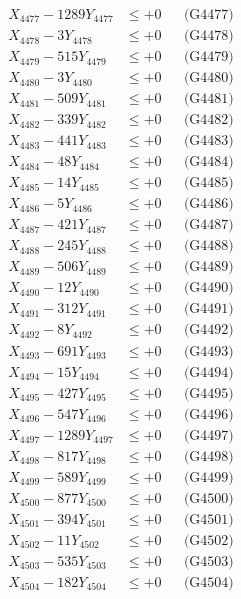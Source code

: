 \documentclass[a4paper,10pt]{article}
\begin{document}
{\begin{align}
X_{4477} - 1289Y_{4477} &\leq +0 && \text{(G4477)} \\
X_{4478} - 3Y_{4478} &\leq +0 && \text{(G4478)} \\
X_{4479} - 515Y_{4479} &\leq +0 && \text{(G4479)} \\
X_{4480} - 3Y_{4480} &\leq +0 && \text{(G4480)} \\
\allowbreak
X_{4481} - 509Y_{4481} &\leq +0 && \text{(G4481)} \\
X_{4482} - 339Y_{4482} &\leq +0 && \text{(G4482)} \\
X_{4483} - 441Y_{4483} &\leq +0 && \text{(G4483)} \\
X_{4484} - 48Y_{4484} &\leq +0 && \text{(G4484)} \\
X_{4485} - 14Y_{4485} &\leq +0 && \text{(G4485)} \\
X_{4486} - 5Y_{4486} &\leq +0 && \text{(G4486)} \\
X_{4487} - 421Y_{4487} &\leq +0 && \text{(G4487)} \\
X_{4488} - 245Y_{4488} &\leq +0 && \text{(G4488)} \\
X_{4489} - 506Y_{4489} &\leq +0 && \text{(G4489)} \\
X_{4490} - 12Y_{4490} &\leq +0 && \text{(G4490)} \\
\allowbreak
X_{4491} - 312Y_{4491} &\leq +0 && \text{(G4491)} \\
X_{4492} - 8Y_{4492} &\leq +0 && \text{(G4492)} \\
X_{4493} - 691Y_{4493} &\leq +0 && \text{(G4493)} \\
X_{4494} - 15Y_{4494} &\leq +0 && \text{(G4494)} \\
X_{4495} - 427Y_{4495} &\leq +0 && \text{(G4495)} \\
X_{4496} - 547Y_{4496} &\leq +0 && \text{(G4496)} \\
X_{4497} - 1289Y_{4497} &\leq +0 && \text{(G4497)} \\
X_{4498} - 817Y_{4498} &\leq +0 && \text{(G4498)} \\
X_{4499} - 589Y_{4499} &\leq +0 && \text{(G4499)} \\
X_{4500} - 877Y_{4500} &\leq +0 && \text{(G4500)} \\
\allowbreak
X_{4501} - 394Y_{4501} &\leq +0 && \text{(G4501)} \\
X_{4502} - 11Y_{4502} &\leq +0 && \text{(G4502)} \\
X_{4503} - 535Y_{4503} &\leq +0 && \text{(G4503)} \\
X_{4504} - 182Y_{4504} &\leq +0 && \text{(G4504)} \\

\end{align}}
\end{document}
